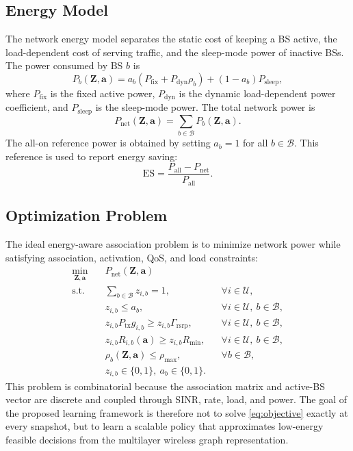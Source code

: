 \documentclass[journal]{IEEEtran}
\begin{document}
\subsection{Energy Model}
The network energy model separates the static cost of keeping a BS active, the
load-dependent cost of serving traffic, and the sleep-mode power of inactive
BSs. The power consumed by BS $b$ is
\begin{equation}
    P_b(\mathbf{Z},\mathbf{a}) =
    a_b\left(P_{\mathrm{fix}} + P_{\mathrm{dyn}}\rho_b\right)
    +(1-a_b)P_{\mathrm{sleep}},
    \label{eq:bs_power}
\end{equation}
where $P_{\mathrm{fix}}$ is the fixed active power, $P_{\mathrm{dyn}}$ is the
dynamic load-dependent power coefficient, and $P_{\mathrm{sleep}}$ is the
sleep-mode power. The total network power is
\begin{equation}
    P_{\mathrm{net}}(\mathbf{Z},\mathbf{a}) =
    \sum_{b\in\mathcal{B}}P_b(\mathbf{Z},\mathbf{a}).
    \label{eq:network_power}
\end{equation}
The all-on reference power is obtained by setting $a_b=1$ for all
$b\in\mathcal{B}$. This reference is used to report energy saving:
\begin{equation}
    \mathrm{ES} =
    \frac{P_{\mathrm{all}}-P_{\mathrm{net}}}{P_{\mathrm{all}}}.
    \label{eq:energy_saving}
\end{equation}

\subsection{Optimization Problem}
The ideal energy-aware association problem is to minimize network power while
satisfying association, activation, QoS, and load constraints:
\begin{align}
    \min_{\mathbf{Z},\mathbf{a}} \quad
    & P_{\mathrm{net}}(\mathbf{Z},\mathbf{a}) \label{eq:objective}\\
    \text{s.t.}\quad
    & \sum_{b\in\mathcal{B}} z_{i,b}=1,
    && \forall i\in\mathcal{U}, \nonumber\\
    & z_{i,b}\leq a_b,
    && \forall i\in\mathcal{U},\ b\in\mathcal{B}, \nonumber\\
    & z_{i,b}P_{\mathrm{tx}}g_{i,b}\geq z_{i,b}\Gamma_{\mathrm{rsrp}},
    && \forall i\in\mathcal{U},\ b\in\mathcal{B}, \nonumber\\
    & z_{i,b}R_{i,b}(\mathbf{a})\geq z_{i,b}R_{\min},
    && \forall i\in\mathcal{U},\ b\in\mathcal{B}, \nonumber\\
    & \rho_b(\mathbf{Z},\mathbf{a})\leq \rho_{\max},
    && \forall b\in\mathcal{B}, \nonumber\\
    & z_{i,b}\in\{0,1\},\ a_b\in\{0,1\}.
    && \nonumber
\end{align}
This problem is combinatorial because the association matrix and active-BS
vector are discrete and coupled through SINR, rate, load, and power. The goal
of the proposed learning framework is therefore not to solve
\eqref{eq:objective} exactly at every snapshot, but to learn a scalable policy
that approximates low-energy feasible decisions from the multilayer wireless
graph representation.
\end{document}
